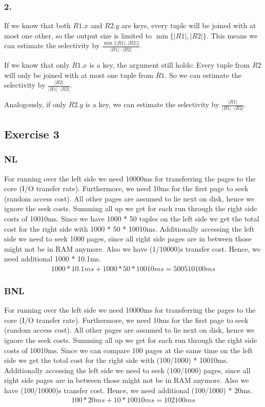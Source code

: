 \documentclass{scrartcl}
\begin{document}
\subsubsection*{2.}

If we know that both $R1.x$ and $R2.y$ are keys, every tuple will be joined with
at most one other, so the output size is limited to $\min\{|R1|, |R2|\}$. This
means we can estimate the selectivity by $\frac{\min\{|R1|, |R2|\}}{|R1| \cdot
|R2|}$.

If we know that only $R1.x$ is a key, the argument still holds: Every tuple from
$R2$ will only be joined with at most one tuple from $R1$. So we can estimate
the selectivity by $\frac{|R2|}{|R1| \cdot |R2|}$.

Analogously, if only $R2.y$ is a key, we can estimate the selectivity by
$\frac{|R1|}{|R1| \cdot |R2|}$.


\subsection*{Exercise 3}
\subsubsection*{NL}
For running over the left side we need 10000ms for transferring the pages to the core (I/O transfer rate). Furthermore,
we need 10ms for the first page to seek (random access cost). All other pages are assumed to lie next on disk, hence we
ignore the seek costs. Summing all up we get for each run through the right side costs of 10010ms.
Since we have 1000 * 50 tuples on the left side we get the total cost for the right side with 1000 * 50 * 10010ms.
Additionally accessing the left side we need to seek 1000 pages, since all right side pages are in between those might
not be in RAM anymore. Also we have (1/10000)s transfer cost. Hence, we need additional 1000 * 10.1ms.
\begin{align}
1000 * 10.1 ms + 1000 * 50 * 10010ms = 500510100 ms
\end{align}


\subsubsection*{BNL}
For running over the left side we need 10000ms for transferring the pages to the core (I/O transfer rate). Furthermore,
we need 10ms for the first page to seek (random access cost). All other pages are assumed to lie next on disk, hence we
ignore the seek costs. Summing all up we get for each run through the right side costs of 10010ms.
Since we can compare 100 pages at the same time on the left side we get the total cost for the right side with
(100/1000) * 10010ms. Additionally accessing the left side we need to seek (100/1000) pages, since all right side pages
are in between those might not be in RAM anymore. Also we have (100/10000)s transfer cost.
Hence, we need additional (100/1000) * 20ms.
\begin{align}
100 * 20 ms + 10 * 10010ms = 102100 ms
\end{align}
\end{document}
